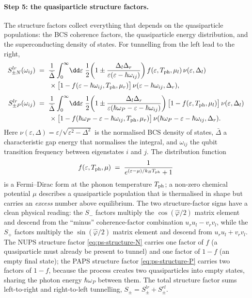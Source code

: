 \paragraph{Step 5: the quasiparticle structure factors.}
The structure factors collect everything that depends on the
quasiparticle populations: the BCS coherence factors, the
quasiparticle energy distribution, and the superconducting density
of states. For tunnelling from the left lead to the right,
\begin{align}
\label{eq:ps-structure-N}
S_{\pm N}^{lr}(\omega_{ij})
&\;=\; \frac{1}{\bar\Delta}\int_0^\infty\!\dd\varepsilon\;
\frac{1}{2}\!\left(1 \pm
\frac{\Delta_l\Delta_r}{\varepsilon(\varepsilon-\hbar\omega_{ij})}\right)
f(\varepsilon,T_{\rm ph},\mu_l)\,\nu(\varepsilon,\Delta_l)\notag\\
&\qquad\times
\bigl[1-f(\varepsilon-\hbar\omega_{ij},T_{\rm ph},\mu_r)\bigr]\,
\nu(\varepsilon-\hbar\omega_{ij},\Delta_r),\\[0.4em]
\label{eq:ps-structure-P}
S_{\pm P}^{lr}(\omega_{ij})
&\;=\; \frac{1}{\bar\Delta}\int_0^\infty\!\dd\varepsilon\;
\frac{1}{2}\!\left(1 \pm
\frac{\Delta_l\Delta_r}{\varepsilon(\hbar\omega_P-\varepsilon-\hbar\omega_{ij})}\right)
\bigl[1-f(\varepsilon,T_{\rm ph},\mu_l)\bigr]\,\nu(\varepsilon,\Delta_l)\notag\\
&\qquad\times
\bigl[1-f(\hbar\omega_P-\varepsilon-\hbar\omega_{ij},T_{\rm ph},\mu_r)\bigr]\,
\nu(\hbar\omega_P-\varepsilon-\hbar\omega_{ij},\Delta_r).
\end{align}
Here $\nu(\varepsilon,\Delta)=\varepsilon/\sqrt{\varepsilon^2-\Delta^2}$
is the normalised BCS density of states, $\bar\Delta$ a
characteristic gap energy that normalises the integral, and
$\omega_{ij}$ the qubit transition frequency between eigenstates
$i$ and $j$. The distribution function
\begin{equation}
\label{eq:ps-distribution}
f(\varepsilon,T_{\rm ph},\mu)
\;=\; \frac{1}{e^{(\varepsilon-\mu)/k_B T_{\rm ph}}+1}
\end{equation}
is a Fermi--Dirac form at the phonon temperature $T_{\rm ph}$; a
non-zero chemical potential $\mu$ describes a quasiparticle
population that is thermalised in shape but carries an
\emph{excess} number above equilibrium. The two structure-factor
signs have a clean physical reading: the $S_{-}$ factors multiply
the $\cos(\hat\varphi/2)$ matrix element and descend from the
``minus'' coherence-factor combination $u_r u_l-v_r v_l$, while the
$S_{+}$ factors multiply the $\sin(\hat\varphi/2)$ matrix element
and descend from $u_r u_l+v_r v_l$. The NUPS structure factor
\cref{eq:ps-structure-N} carries one factor of $f$ (a quasiparticle
must already be present to tunnel) and one factor of $1-f$ (an
empty final state); the PAPS structure factor
\cref{eq:ps-structure-P} carries two factors of $1-f$, because the
process creates two quasiparticles into empty states, sharing the
photon energy $\hbar\omega_P$ between them. The total structure
factor sums left-to-right and right-to-left tunnelling,
$S_\pm = S_\pm^{lr}+S_\pm^{rl}$.


